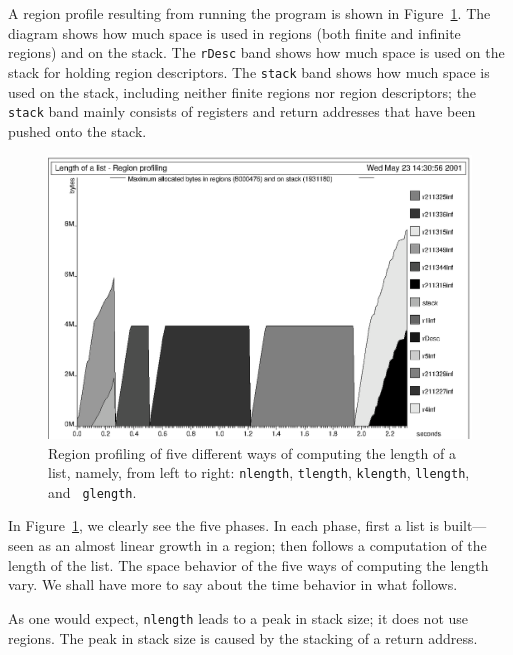 \documentclass[12pt]{book}
\begin{document}
A region profile resulting from running the program is shown in
Figure~\ref{length.region.fig}.  The diagram shows how much space is
used in regions (both finite and infinite regions) and on the stack.
The
%
{\tt rDesc} band shows how much space is used on the stack for holding
region descriptors. The
%
{\tt stack} band shows how much space is used on the stack, including
neither finite regions nor region descriptors; the {\tt stack} band
mainly consists of registers and return addresses that have been
pushed onto the stack.
\begin{figure}
\begin{center}
\includegraphics{length.region.ps}
\end{center}
\caption{Region profiling of five different
  ways of computing the length of a list, namely, from left to right:
  {\tt nlength}, {\tt tlength}, {\tt klength}, {\tt llength}, and {\tt
    glength}.}
\label{length.region.fig}
\end{figure}

In Figure~\ref{length.region.fig}, we clearly see the five phases.  In
each phase, first a list is built---seen as an almost linear growth in
a region; then follows a computation of the length of the list.  The
space behavior of the five ways of computing the length vary. We shall
have more to say about the time behavior in what follows.

As one would expect, {\tt nlength} leads to a peak in stack size; it
does not use regions. The peak in stack size is caused by the stacking
of a return address.
\end{document}
